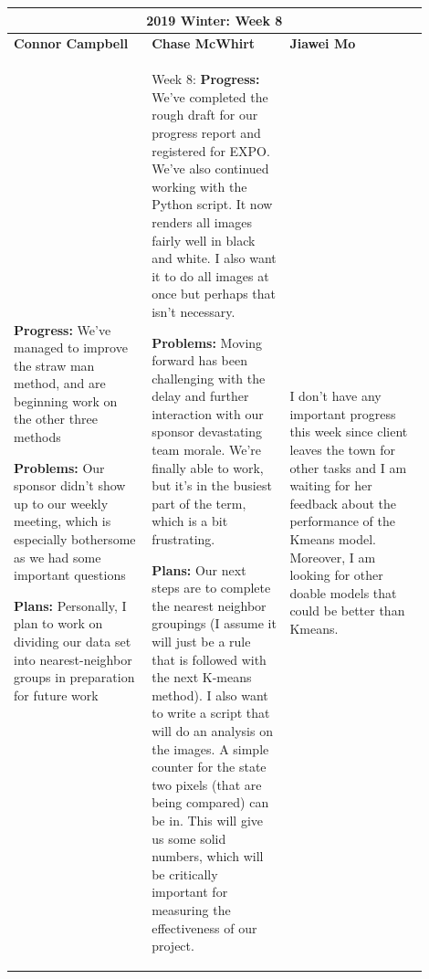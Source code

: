 \documentclass[10pt,journal,compsoc, draftclsnofoot,onecolumn]{IEEEtran}
\begin{document}
\begin{center}
\begin{tabular}{|p{0.3\linewidth}|p{0.3\linewidth}|p{0.3\linewidth}|}
\hline
\multicolumn{3}{|c|}{\textbf{2019 Winter: Week 8}} \\
\hline
\textbf{Connor Campbell} & \textbf{Chase McWhirt} & \textbf{Jiawei Mo} \\ [0.5ex]
\hline\hline

\textbf{Progress:} We've managed to improve the straw man method, and are beginning work on the other three methods

\textbf{Problems:} Our sponsor didn't show up to our weekly meeting, which is especially bothersome as we had some important questions

\textbf{Plans:} Personally, I plan to work on dividing our data set into nearest-neighbor groups in preparation for future work
&
Week 8:
\textbf{Progress:} We've completed the rough draft for our progress report and registered for EXPO.
We've also continued working with the Python script.
It now renders all images fairly well in black and white.
I also want it to do all images at once but perhaps that isn't necessary.

\textbf{Problems:} Moving forward has been challenging with the delay and further interaction with our sponsor devastating team morale.
We're finally able to work, but it's in the busiest part of the term, which is a bit frustrating.

\textbf{Plans:} Our next steps are to complete the nearest neighbor groupings (I assume it will just be a rule that is followed with the next K-means method).
I also want to write a script that will do an analysis on the images.
A simple counter for the state two pixels (that are being compared) can be in.
This will give us some solid numbers, which will be critically important for measuring the effectiveness of our project.
&
I don't have any important progress this week since client leaves the town for other tasks and I am waiting for her feedback about the performance of the Kmeans model. Moreover, I am looking for other doable models that could be better than Kmeans.
\\ \hline
\end{tabular}
\end{center}
\end{document}
